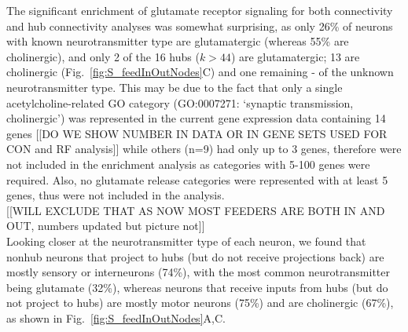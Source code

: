 \documentclass[10pt,letterpaper]{article}
\begin{document}
The significant enrichment of glutamate receptor signaling for both connectivity and hub connectivity analyses was somewhat surprising, as only 26\% of neurons with known neurotransmitter type are glutamatergic (whereas 55\% are cholinergic), and only 2 of the 16 hubs ($k > 44$) are glutamatergic; 13 are cholinergic (Fig.~\ref{fig:S_feedInOutNodes}C) and one remaining - of the unknown neurotransmitter type.
This may be due to the fact that only a single acetylcholine-related GO category (GO:0007271: `synaptic transmission, cholinergic') was represented in the current gene expression data containing 14 genes [[DO WE SHOW NUMBER IN DATA OR IN GENE SETS USED FOR CON and RF analysis]] while others (n=9) had only up to 3 genes, therefore were not included in the enrichment analysis as categories with 5-100 genes were required. 
Also, no glutamate release categories were represented with at least 5 genes, thus were not included in the analysis.\\

[[WILL EXCLUDE THAT AS NOW MOST FEEDERS ARE BOTH IN AND OUT, numbers updated but picture not]] \\
Looking closer at the neurotransmitter type of each neuron, we found that nonhub neurons that project to hubs (but do not receive projections back) are mostly sensory or interneurons (74\%), with the most common neurotransmitter being glutamate (32\%), whereas neurons that receive inputs from hubs (but do not project to hubs) are mostly motor neurons (75\%) and are cholinergic (67\%), as shown in Fig.~\ref{fig:S_feedInOutNodes}A,C.\\

\end{document}
